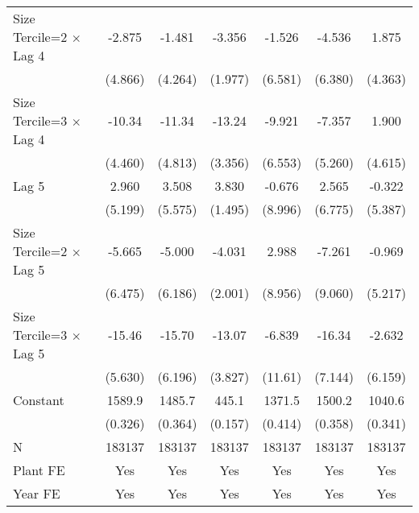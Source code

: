 \begin{table}[htbp]
\begin{tabular}{l*{6}{c}}
\addlinespace
Size Tercile=2 $\times$ Lag 4&   -2.875         &   -1.481         &   -3.356         &   -1.526         &   -4.536         &    1.875         \\
                &  (4.866)         &  (4.264)         &  (1.977)         &  (6.581)         &  (6.380)         &  (4.363)         \\
\addlinespace
Size Tercile=3 $\times$ Lag 4&   -10.34\sym{*}  &   -11.34\sym{*}  &   -13.24\sym{***}&   -9.921         &   -7.357         &    1.900         \\
                &  (4.460)         &  (4.813)         &  (3.356)         &  (6.553)         &  (5.260)         &  (4.615)         \\
\addlinespace
Lag 5           &    2.960         &    3.508         &    3.830\sym{*}  &   -0.676         &    2.565         &   -0.322         \\
                &  (5.199)         &  (5.575)         &  (1.495)         &  (8.996)         &  (6.775)         &  (5.387)         \\
\addlinespace
Size Tercile=2 $\times$ Lag 5&   -5.665         &   -5.000         &   -4.031\sym{*}  &    2.988         &   -7.261         &   -0.969         \\
                &  (6.475)         &  (6.186)         &  (2.001)         &  (8.956)         &  (9.060)         &  (5.217)         \\
\addlinespace
Size Tercile=3 $\times$ Lag 5&   -15.46\sym{**} &   -15.70\sym{*}  &   -13.07\sym{***}&   -6.839         &   -16.34\sym{*}  &   -2.632         \\
                &  (5.630)         &  (6.196)         &  (3.827)         &  (11.61)         &  (7.144)         &  (6.159)         \\
\addlinespace
Constant        &   1589.9\sym{***}&   1485.7\sym{***}&    445.1\sym{***}&   1371.5\sym{***}&   1500.2\sym{***}&   1040.6\sym{***}\\
                &  (0.326)         &  (0.364)         &  (0.157)         &  (0.414)         &  (0.358)         &  (0.341)         \\
\midrule
N               &   183137         &   183137         &   183137         &   183137         &   183137         &   183137         \\
Plant FE        &      Yes         &      Yes         &      Yes         &      Yes         &      Yes         &      Yes         \\
Year FE         &      Yes         &      Yes         &      Yes         &      Yes         &      Yes         &      Yes         \\

\end{tabular}
\end{table}
